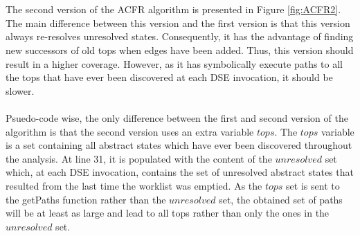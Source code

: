 \documentclass{kththesis}
\begin{document}
\\ \\
The second version of the ACFR algorithm is presented in Figure \ref{fig:ACFR2}. The main difference between this version and the first version is that this version always re-resolves unresolved states. Consequently, it has the advantage of finding new successors of old tops when edges have been added. Thus, this version should result in a higher coverage. However, as it has symbolically execute paths to all the tops that have ever been discovered at each DSE invocation, it should be slower. 
\\ \\
Psuedo-code wise, the only difference between the first and second version of the algorithm is that the second version uses an extra variable $tops$. The $tops$ variable is a set containing all abstract states which have ever been discovered throughout the analysis. At line 31, it is populated with the content of the $unresolved$ set which, at each DSE invocation, contains the set of unresolved abstract states that resulted from the last time the worklist was emptied. As the $tops$ set is sent to the getPaths function rather than the $unresolved$ set, the obtained set of paths will be at least as large and lead to all tops rather than only the ones in the $unresolved$ set.






\clearpage

\end{document}
